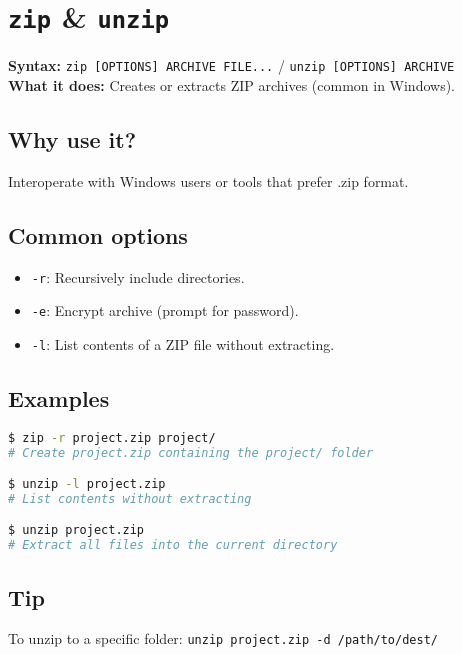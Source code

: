 \documentclass[10pt,oneside]{scrbook}
\begin{document}
\section{\texttt{zip} \& \texttt{unzip}}
\begin{cmdbox}
  \textbf{Syntax:} \lstinline!zip [OPTIONS] ARCHIVE FILE...! / \lstinline!unzip [OPTIONS] ARCHIVE! \\
  \textbf{What it does:} Creates or extracts ZIP archives (common in Windows).
\end{cmdbox}
\begin{commanddetails}
  \subsection*{Why use it?}
    Interoperate with Windows users or tools that prefer .zip format.

  \subsection*{Common options}
    \begin{itemize}
      \item \lstinline!-r!: Recursively include directories.  
      \item \lstinline!-e!: Encrypt archive (prompt for password).  
      \item \lstinline!-l!: List contents of a ZIP file without extracting.  
    \end{itemize}

  \subsection*{Examples}
  \begin{lstlisting}[language=bash]
$ zip -r project.zip project/
# Create project.zip containing the project/ folder

$ unzip -l project.zip
# List contents without extracting

$ unzip project.zip
# Extract all files into the current directory
  \end{lstlisting}

  \subsection*{Tip}
    To unzip to a specific folder:  
    \lstinline!unzip project.zip -d /path/to/dest/!
\end{commanddetails}
\end{document}

